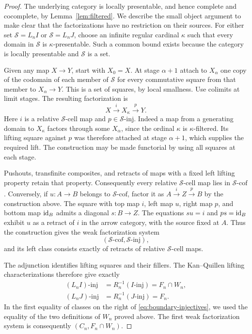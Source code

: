\begin{proof}
The underlying category is locally presentable, and hence complete
and cocomplete, by Lemma~\ref{lem:filtered}.  We describe the small
object argument to make clear that the factorizations have no
restriction on their sources.  For either set
$\mathcal S=L_nI$ or $\mathcal S=L_nJ$, choose an infinite regular
cardinal $\kappa$ such that every domain in $\mathcal S$ is
$\kappa$-presentable.  Such a common bound exists because the
category is locally presentable and $\mathcal S$ is a set.

Given any map $X\to Y$, start with $X_0=X$.  At stage $\alpha+1$
attach to $X_\alpha$ one copy of the codomain of each member of
$\mathcal S$ for every commutative square from that member to
$X_\alpha\to Y$.  This is a set of squares, by local smallness.
Use colimits at limit stages.  The resulting factorization is
\[
 X\xrightarrow{i}X_\kappa\xrightarrow{p}Y.
\]
Here $i$ is a relative $\mathcal S$-cell map and
$p\in\mathcal S\text{-inj}$.  Indeed a map from a generating
domain to $X_\kappa$ factors through some $X_\alpha$, since the
ordinal $\kappa$ is $\kappa$-filtered.  Its lifting square against
$p$ was therefore attached at stage $\alpha+1$, which supplies the
required lift.  The construction may be made functorial by using
all squares at each stage.

Pushouts, transfinite composites, and retracts of maps with a fixed
left lifting property retain that property.  Consequently every
relative $\mathcal S$-cell map lies in $\mathcal S\text{-cof}$.
Conversely, if $u:A\to B$ belongs to $\mathcal S\text{-cof}$,
factor it as $A\xrightarrow{i}Z\xrightarrow{p}B$ by the construction
above.  The square with top map $i$, left map $u$, right map $p$,
and bottom map $\mathrm{id}_B$ admits a diagonal $s:B\to Z$.  The equations
$su=i$ and $ps=\mathrm{id}_B$ exhibit $u$ as a retract of $i$ in the arrow
category, with the source fixed at $A$.  Thus the construction gives
the weak factorization system
\[
 (\mathcal S\text{-cof},\mathcal S\text{-inj}),
\]
and its left class consists exactly of retracts of relative
$\mathcal S$-cell maps.

The adjunction identifies lifting squares and their fillers.  The
Kan--Quillen lifting characterizations therefore give exactly
\begin{align}
 (L_nI)\text{-inj}
   &=R_n^{-1}(I\text{-inj})=F_n\cap W_n,
       \label{eq:boundary-injectives}\\
 (L_nJ)\text{-inj}
   &=R_n^{-1}(J\text{-inj})=F_n.
       \label{eq:horn-injectives}
\end{align}
In the first equality of classes on the right of
\eqref{eq:boundary-injectives}, we used the equality of the two
definitions of $W_n$ proved above.  The first weak factorization
system is consequently $(C_n,F_n\cap W_n)$.


\end{proof}
